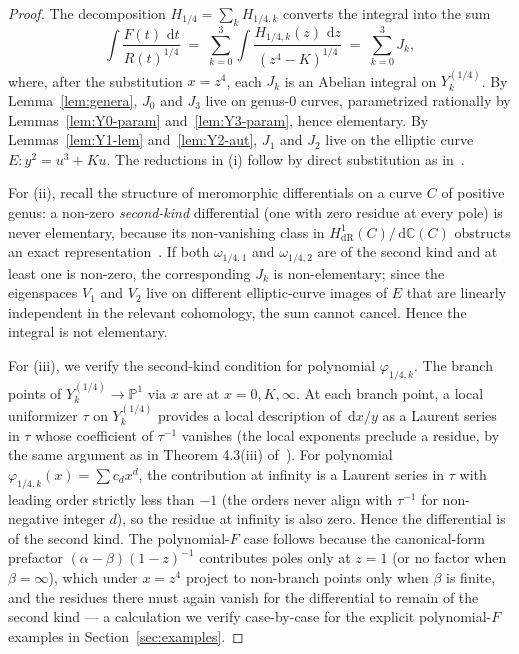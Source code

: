 \documentclass[11pt,a4paper]{article}
\theoremstyle{plain}
\theoremstyle{definition}
\theoremstyle{remark}
\newcommand{\C}{\mathbb{C}}
\renewcommand{\d}{\,\mathrm{d}}
\begin{document}
\begin{proof}
The decomposition $H_{1/4} = \sum_k H_{1/4, k}$ converts the integral into the sum
\[
  \int \frac{F(t)\,\d t}{R(t)^{1/4}} \;=\; \sum_{k=0}^{3} \int \frac{H_{1/4, k}(z)\,\d z}{(z^4 - K)^{1/4}} \;=\; \sum_{k=0}^{3} J_k,
\]
where, after the substitution $x = z^4$, each $J_k$ is an Abelian integral on $Y_k^{(1/4)}$. By Lemma~\ref{lem:genera}, $J_0$ and $J_3$ live on genus-$0$ curves, parametrized rationally by Lemmas~\ref{lem:Y0-param} and~\ref{lem:Y3-param}, hence elementary. By Lemmas~\ref{lem:Y1-lem} and~\ref{lem:Y2-aut}, $J_1$ and $J_2$ live on the elliptic curve $E\colon y^2 = u^3 + Ku$. The reductions in (i) follow by direct substitution as in~\cite{GoursatCubic}.

For (ii), recall the structure of meromorphic differentials on a curve $C$ of positive genus: a non-zero \emph{second-kind} differential (one with zero residue at every pole) is never elementary, because its non-vanishing class in $H^1_{\mathrm{dR}}(C)/\d\C(C)$ obstructs an exact representation~\cite[Ch.\ 5]{Bronstein2005}. If both $\omega_{1/4,1}$ and $\omega_{1/4,2}$ are of the second kind and at least one is non-zero, the corresponding $J_k$ is non-elementary; since the eigenspaces $V_1$ and $V_2$ live on different elliptic-curve images of $E$ that are linearly independent in the relevant cohomology, the sum cannot cancel. Hence the integral is not elementary.

For (iii), we verify the second-kind condition for polynomial $\varphi_{1/4,k}$. The branch points of $Y_k^{(1/4)} \to \mathbb{P}^1$ via $x$ are at $x=0, K, \infty$. At each branch point, a local uniformizer $\tau$ on $Y_k^{(1/4)}$ provides a local description of $\d x/y$ as a Laurent series in $\tau$ whose coefficient of $\tau^{-1}$ vanishes (the local exponents preclude a residue, by the same argument as in Theorem 4.3(iii) of~\cite{GoursatCubic}). For polynomial $\varphi_{1/4,k}(x) = \sum c_d x^d$, the contribution at infinity is a Laurent series in $\tau$ with leading order strictly less than $-1$ (the orders never align with $\tau^{-1}$ for non-negative integer $d$), so the residue at infinity is also zero. Hence the differential is of the second kind. The polynomial-$F$ case follows because the canonical-form prefactor $(\alpha-\beta)(1-z)^{-1}$ contributes poles only at $z=1$ (or no factor when $\beta=\infty$), which under $x = z^4$ project to non-branch points only when $\beta$ is finite, and the residues there must again vanish for the differential to remain of the second kind --- a calculation we verify case-by-case for the explicit polynomial-$F$ examples in Section~\ref{sec:examples}.
\end{proof}
\end{document}
